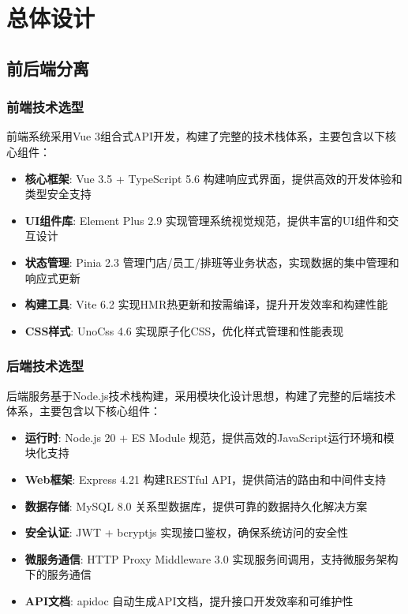\documentclass{ctexart}
\begin{document}
\section{总体设计}
\subsection{前后端分离}
\subsubsection{前端技术选型}
前端系统采用Vue 3组合式API开发，构建了完整的技术栈体系，主要包含以下核心组件：
\begin{itemize}
    \item \textbf{核心框架}: Vue 3.5 + TypeScript 5.6 构建响应式界面，提供高效的开发体验和类型安全支持
    \item \textbf{UI组件库}: Element Plus 2.9 实现管理系统视觉规范，提供丰富的UI组件和交互设计
    \item \textbf{状态管理}: Pinia 2.3 管理门店/员工/排班等业务状态，实现数据的集中管理和响应式更新
    \item \textbf{构建工具}: Vite 6.2 实现HMR热更新和按需编译，提升开发效率和构建性能
    \item \textbf{CSS样式}: UnoCss 4.6 实现原子化CSS，优化样式管理和性能表现
\end{itemize}

\subsubsection{后端技术选型}
后端服务基于Node.js技术栈构建，采用模块化设计思想，构建了完整的后端技术体系，主要包含以下核心组件：
\begin{itemize}
    \item \textbf{运行时}: Node.js 20 + ES Module 规范，提供高效的JavaScript运行环境和模块化支持
    \item \textbf{Web框架}: Express 4.21 构建RESTful API，提供简洁的路由和中间件支持
    \item \textbf{数据存储}: MySQL 8.0 关系型数据库，提供可靠的数据持久化解决方案
    \item \textbf{安全认证}: JWT + bcryptjs 实现接口鉴权，确保系统访问的安全性
    \item \textbf{微服务通信}: HTTP Proxy Middleware 3.0 实现服务间调用，支持微服务架构下的服务通信
    \item \textbf{API文档}: apidoc 自动生成API文档，提升接口开发效率和可维护性
\end{itemize}
\end{document}
